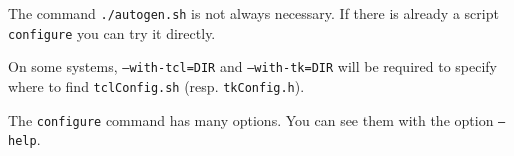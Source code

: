 The command \texttt{./autogen.sh} is not always necessary. If there is
already a script \texttt{configure} you can try it directly.

On some systems, \texttt{--with-tcl=DIR} and \texttt{--with-tk=DIR} will be
required to specify where to find \texttt{tclConfig.sh} (resp. \texttt{tkConfig.h}). 

The \texttt{configure} command has many options. You can see them with the
option \texttt{--help}. 


